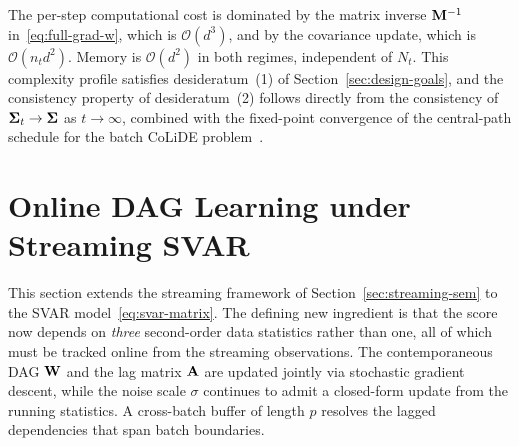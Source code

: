 \documentclass[journal,twoside]{IEEEtran}
\begin{document}
The per-step computational cost is dominated by the matrix inverse
${\mathbf M}^{-1}$ in~\eqref{eq:full-grad-w}, which is
$\mathcal{O}(d^3)$, and by the covariance update, which is
$\mathcal{O}(n_t d^2)$. Memory is $\mathcal{O}(d^2)$ in both regimes,
independent of $N_t$. This complexity profile satisfies
desideratum~(1) of Section~\ref{sec:design-goals}, and the consistency
property of desideratum~(2) follows directly from the consistency of
$\boldsymbol{\Sigma}_t \to \boldsymbol{\Sigma}$ as $t \to \infty$, combined with the
fixed-point convergence of the central-path schedule for the
batch CoLiDE problem~\cite{saboksayr2023colide}.


\section{Online DAG Learning under Streaming SVAR}
\label{sec:streaming-svar}

This section extends the streaming framework of
Section~\ref{sec:streaming-sem} to the SVAR
model~\eqref{eq:svar-matrix}. The defining new ingredient is that the
score now depends on \emph{three} second-order data statistics rather
than one, all of which must be tracked online from the streaming
observations. The contemporaneous DAG ${\mathbf W}$ and the lag matrix
${\mathbf A}$ are updated jointly via stochastic gradient descent, while the
noise scale $\sigma$ continues to admit a closed-form update from the
running statistics. A cross-batch buffer of length $p$ resolves the
lagged dependencies that span batch boundaries.
\end{document}
